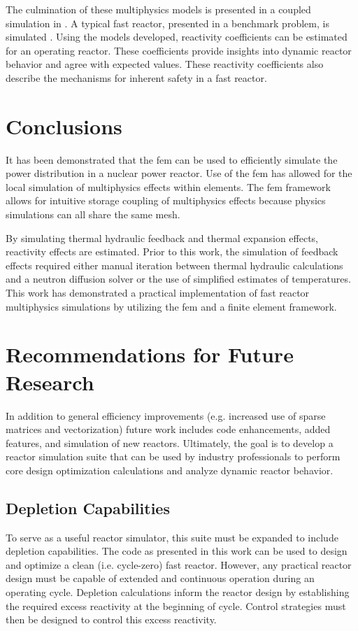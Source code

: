   The culmination of these multiphysics models is presented in a coupled
  simulation in . A typical fast reactor, presented in 
  a benchmark problem, is simulated \cite{abr}. Using the models developed, 
  reactivity coefficients can be estimated for an operating reactor. These 
  coefficients provide insights into dynamic reactor behavior and agree with 
  expected values. These reactivity coefficients also describe the mechanisms 
  for inherent safety in a fast reactor.

\section{Conclusions}
  
  It has been demonstrated that the \gls{fem} can be used to efficiently 
  simulate the power distribution in a nuclear power reactor. Use of the
  \gls{fem} has allowed for the local simulation of multiphysics effects within 
  elements. The \gls{fem} framework allows for intuitive storage coupling of
  multiphysics effects because physics simulations can all share the same mesh.

  By simulating thermal hydraulic feedback and thermal expansion 
  effects, reactivity effects are estimated. Prior to this work, the 
  simulation of feedback effects required either manual iteration between 
  thermal hydraulic calculations and a neutron diffusion solver or the use of 
  simplified estimates of temperatures. This work has demonstrated a practical
  implementation of fast reactor multiphysics simulations by utilizing the
  \gls{fem} and a finite element framework.
  
\section{Recommendations for Future Research}

  In addition to general efficiency improvements (e.g. increased use of sparse
  matrices and vectorization) future work includes code enhancements, added 
  features, and simulation of new reactors. Ultimately, the goal is to develop a
  reactor simulation suite that can be used by industry professionals to perform 
  core design optimization calculations and analyze dynamic reactor behavior. 

  \subsection{Depletion Capabilities}
    To serve as a useful reactor simulator, this suite must be expanded to 
    include depletion capabilities. The code as presented in this work can be 
    used to design and optimize a clean (i.e. cycle-zero) fast reactor. However,
    any practical reactor design must be capable of extended and continuous 
    operation during an operating cycle. Depletion calculations inform the 
    reactor design by establishing the required excess reactivity at the 
    beginning of cycle. Control strategies must then be designed to control 
    this excess reactivity. 

